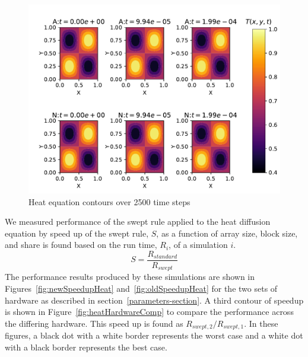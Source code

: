 \documentclass[review]{elsarticle}
\begin{document}
\begin{figure}[htb!]
    \centering
    \includegraphics{figs/heatValidate.pdf}
    \caption{Heat equation contours over 2500 time steps}
    \label{fig:heatSurface}
\end{figure}

We measured performance of the swept rule applied to the heat diffusion equation by speed up of the swept rule, $S$, as a function of array size, block size, and share is found based on the run time, $R_i$, of a simulation $i$. 
\begin{equation}
    S = \frac{R_{standard}}{R_{swept}}
\end{equation}
The performance results produced by these simulations are shown in Figures~\ref{fig:newSpeedupHeat} and~\ref{fig:oldSpeedupHeat} for the two sets of hardware as described in section~\ref{parameters-section}. 
A third contour of speedup is shown in Figure~\ref{fig:heatHardwareComp} to compare the performance across  the differing hardware. This speed up is found as $R_{swept,2}/R_{swept,1}$. In these figures, a black dot with a white border represents the worst case and a white dot with a black border represents the best case.
\end{document}
